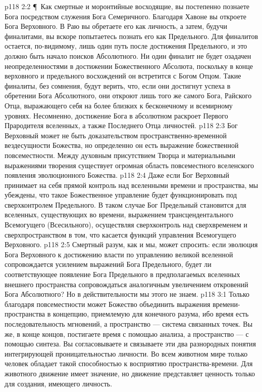 \vs p118 2:2 \P\ Как смертные и моронтийные восходящие, вы постепенно познаете Бога посредством служения Бога Семеричного. Благодаря Хавоне вы откроете Бога Верховного. В Раю вы обретаете его как личность, а затем, будучи финалитами, вы вскоре попытаетесь познать его как Предельного. Для финалитов остается, по\hyp{}видимому, лишь один путь после достижения Предельного, и это должно быть начало поисков Абсолютного. Ни один финалит не будет озадачен неопределенностями в достижении Божественного Абсолюта, поскольку в конце верховного и предельного восхождений он встретится с Богом Отцом. Такие финалиты, без сомнения, будут верить, что, если они достигнут успеха в обретении Бога Абсолютного, они откроют лишь того же самого Бога, Райского Отца, выражающего себя на более близких к бесконечному и всемирному уровнях. Несомненно, достижение Бога в абсолютном раскроет Первого Прародителя вселенных, а также Последнего Отца личностей.
\vs p118 2:3 Бог Верховный может не быть доказательством пространственно\hyp{}временной вездесущности Божества, но определенно он есть выражение божественной повсеместности. Между духовным присутствием Творца и материальными выражениями творения существует огромная область повсеместного  вселенского появления эволюционного Божества.
\vs p118 2:4 Даже если Бог Верховный принимает на себя прямой контроль над вселенными времени и пространства, мы убеждены, что такое Божественное управление будет функционировать под сверхконтролем Предельного. В таком случае Бог Предельный становится для вселенных, существующих во времени, выражением трансцендентального Всемогущего (Всесильного), осуществляя сверхконтроль над сверхвременем и сверхпространством в том, что касается функций управления Всемогущего Верховного.
\vs p118 2:5 Смертный разум, как и мы, может спросить: если эволюция Бога Верховного к достижению власти по управлению великой вселенной сопровождается усилением выражений Бога Предельного, будет ли соответствующее появление Бога Предельного в предполагаемых вселенных внешнего пространства сопровождаться аналогичным увеличением откровений Бога Абсолютного? Но в действительности мы этого не знаем.
\vs p118 3:1 Только благодаря повсеместности может Божество объединить выражения времени\hyp{}пространства в концепцию, приемлемую для конечного разума, ибо время есть последовательность мгновений, а пространство --- система связанных точек. Вы же, в конце концов, постигаете время с помощью анализа, а пространство --- с помощью синтеза. Вы согласовываете и связываете эти два разнородных понятия интегрирующей проницательностью личности. Во всем животном мире только человек обладает такой способностью к восприятию пространства\hyp{}времени. Для животного движение имеет значение, но движение представляет ценность только для создания, имеющего личность.
